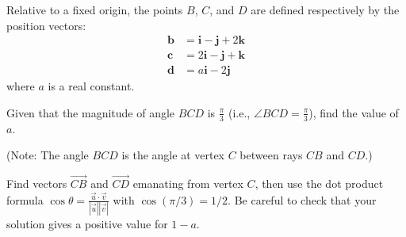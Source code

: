 \begin{problem}
Relative to a fixed origin, the points $B$, $C$, and $D$ are defined respectively by the position vectors:
\begin{align*}
\mathbf{b} &= \mathbf{i} - \mathbf{j} + 2\mathbf{k} \\
\mathbf{c} &= 2\mathbf{i} - \mathbf{j} + \mathbf{k} \\
\mathbf{d} &= a\mathbf{i} - 2\mathbf{j}
\end{align*}
where $a$ is a real constant.

Given that the magnitude of angle $BCD$ is $\frac{\pi}{3}$ (i.e., $\angle BCD = \frac{\pi}{3}$), find the value of $a$.

\begin{center}
\end{center}

(Note: The angle $BCD$ is the angle at vertex $C$ between rays $CB$ and $CD$.)
\end{problem}

\begin{hint}
Find vectors $\overrightarrow{CB}$ and $\overrightarrow{CD}$ emanating from vertex $C$, then use the dot product formula $\cos\theta = \frac{\vec{u} \cdot \vec{v}}{|\vec{u}||\vec{v}|}$ with $\cos(\pi/3) = 1/2$. Be careful to check that your solution gives a positive value for $1-a$.
\end{hint}

